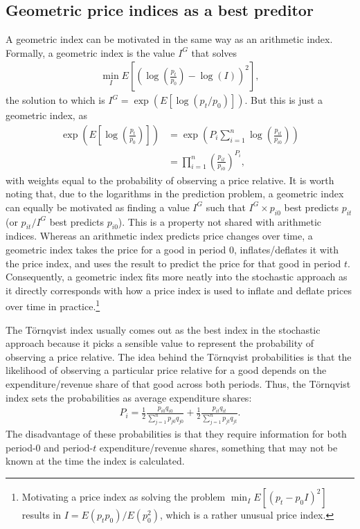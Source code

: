 \documentclass[]{article}
\begin{document}
\hypertarget{geometric-price-indices-as-a-best-preditor}{%
\subsection{Geometric price indices as a best preditor}\label{geometric-price-indices-as-a-best-preditor}}

A geometric index can be motivated in the same way as an arithmetic index. Formally, a geometric index is the value \(I^{G}\) that solves
\begin{align*}
\min_{I} E\left[\left(\log\left(\frac{p_{t}}{p_{0}}\right) - \log(I) \right)^{2}\right],
\end{align*}
the solution to which is \(I^{G} = \exp(E[\log(p_{t} / p_{0})])\). But this is just a geometric index, as
\begin{align*}
\exp\left(E\left[\log\left(\frac{p_{t}}{p_{0}}\right)\right]\right) &= \exp\left(P_{i} \sum_{i = 1}^{n} \log\left(\frac{p_{it}}{p_{i0}}\right)\right) \\
&= \prod_{i = 1}^{n} \left(\frac{p_{it}}{p_{i0}}\right)^{P_{i}},
\end{align*}
with weights equal to the probability of observing a price relative. It is worth noting that, due to the logarithms in the prediction problem, a geometric index can equally be motivated as finding a value \(I^{G}\) such that \(I^{G} \times p_{i0}\) best predicts \(p_{it}\) (or \(p_{it} / I^{G}\) best predicts \(p_{i0}\)). This is a property not shared with arithmetic indices. Whereas an arithmetic index predicts price changes over time, a geometric index takes the price for a good in period 0, inflates/deflates it with the price index, and uses the result to predict the price for that good in period \(t\). Consequently, a geometric index fits more neatly into the stochastic approach as it directly corresponds with how a price index is used to inflate and deflate prices over time in practice.\footnote{Motivating a price index as solving the problem \(\min_{I} E[(p_{t} - p_{0} I)^{2}]\) results in \(I = E(p_{t} p_{0}) / E(p_{0}^{2})\), which is a rather unusual price index.}

The Törnqvist index usually comes out as the best index in the stochastic approach because it picks a sensible value to represent the probability of observing a price relative. The idea behind the Törnqvist probabilities is that the likelihood of observing a particular price relative for a good depends on the expenditure/revenue share of that good across both periods. Thus, the Törnqvist index sets the probabilities as average expenditure shares:
\begin{align*}
P_{i} = \frac{1}{2} \frac{p_{i0}q_{i0}}{\sum_{j = 1}^{n} p_{j0}q_{j0}} + \frac{1}{2} \frac{p_{it}q_{it}}{\sum_{j = 1}^{n} p_{jt}q_{jt}}.
\end{align*}
The disadvantage of these probabilities is that they require information for both period-0 and period-\(t\) expenditure/revenue shares, something that may not be known at the time the index is calculated.
\end{document}
